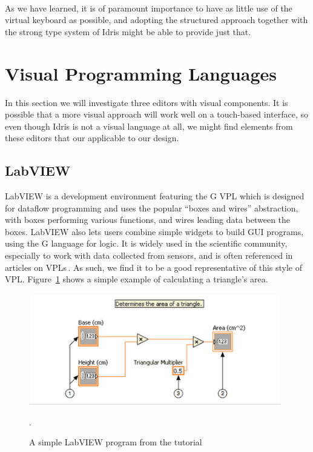 \paragraph{}

As we have learned, it is of paramount importance to have as little use of the virtual keyboard as possible, and adopting the structured approach together with the strong type system of Idris might be able to provide just that.

\section{Visual Programming Languages} %
\label{sub:visual_programming_languages}
In this section we will investigate three editors with visual components.
It is possible that a more visual approach will work well on a touch-based interface, so even though Idris is not a visual language at all, we might find elements from these editors that our applicable to our design.

\subsection{LabVIEW}
\label{subsub:LabVIEW}
LabVIEW is a development environment featuring the G VPL which is designed for dataflow programming and uses the popular ``boxes and wires'' abstraction, with boxes performing various functions, and wires leading data between the boxes.
LabVIEW also lets users combine simple widgets to build GUI programs, using the G language for logic.
It is widely used in the scientific community, especially to work with data collected from sensors, and is often referenced in articles on VPLs\,\cite{Green96usabilityanalysis,DBLP:journals/ijmms/PetreB99}.
As such, we find it to be a good representative of this style of VPL\@.
Figure~\ref{fig:LabVIEWGettingStarted} shows a simple example of calculating a
triangle's area.

\begin{figure}[h]
\centering
\includegraphics[width=110mm]{diagrams/LabVIEW_screenshot.png}
\caption{A simple LabVIEW program from the tutorial\,\cite{LabVIEW:GettingStarted}}.
\label{fig:LabVIEWGettingStarted}
\end{figure}

